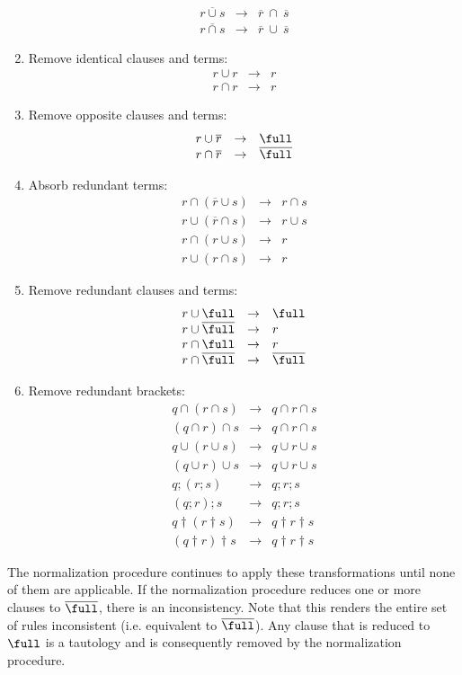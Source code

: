 \documentclass[11pt,a4paper,fleqn,oneside]{article}
\newcommand{\cmpl}[1]{\overline{#1}}
\newcommand{\compose}{;}
\begin{document}
\begin{enumerate}
\[\begin{array}{rcl}
	\cmpl{r\cup s}&\rightarrow&\cmpl{r}\ \cap\ \cmpl{s}\\
	\cmpl{r\cap s}&\rightarrow&\cmpl{r}\ \cup\ \cmpl{s}
  \end{array}\]
\item	Remove identical clauses and terms:
  \[\begin{array}{rcl}
	r\cup r&\rightarrow&r\\
	r\cap r&\rightarrow&r
  \end{array}\]
\item	Remove opposite clauses and terms:
  \[\begin{array}{rcl}
	r\cup \cmpl{r}&\rightarrow&\full\\
	r\cap \cmpl{r}&\rightarrow&\cmpl{\full}
  \end{array}\]
\item	Absorb redundant terms:
  \[\begin{array}{rcl}
	r\cap(\cmpl{r}\cup s)&\rightarrow&r\cap s\\
	r\cup(\cmpl{r}\cap s)&\rightarrow&r\cup s\\
	r\cap(r\cup s)&\rightarrow&r\\
	r\cup(r\cap s)&\rightarrow&r
  \end{array}\]
\item	Remove redundant clauses and terms:
  \[\begin{array}{rcl}
	r\cup \full&\rightarrow&\full\\
	r\cup \cmpl{\full}&\rightarrow&r\\
	r\cap \full&\rightarrow&r\\
	r\cap \cmpl{\full}&\rightarrow&\cmpl{\full}
  \end{array}\]
\item	Remove redundant brackets:
  \[\begin{array}{rcl}
	q\cap(r\cap s)&\rightarrow&q\cap r\cap s\\
	(q\cap r)\cap s&\rightarrow&q\cap r\cap s\\
	q\cup(r\cup s)&\rightarrow&q\cup r\cup s\\
	(q\cup r)\cup s&\rightarrow&q\cup r\cup s\\
	q\compose(r\compose s)&\rightarrow&q\compose r\compose s\\
	(q\compose r)\compose s&\rightarrow&q\compose r\compose s\\
	q\dagger(r\dagger s)&\rightarrow&q\dagger r\dagger s\\
	(q\dagger r)\dagger s&\rightarrow&q\dagger r\dagger s
  \end{array}\]
\end{enumerate}
	The normalization procedure continues to apply these transformations until none of them are applicable.
	If the normalization procedure reduces one or more clauses to $\cmpl{\full}$,
	there is an inconsistency.
	Note that this renders the entire set of rules inconsistent (i.e. equivalent to $\cmpl{\full}$).
	Any clause that is reduced to $\full$ is a tautology and is consequently removed by the normalization procedure.
\end{document}
